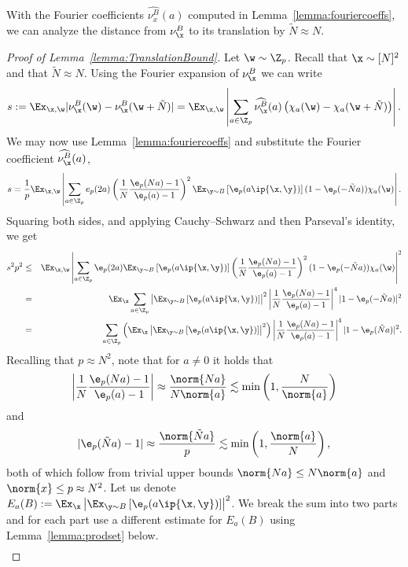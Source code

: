 With the Fourier coefficients $\widehat{\nu^B_x}(a)$ computed in Lemma~\ref{lemma:fouriercoeffs}, we can analyze the distance from $\nu^B_\x$ to its translation by $\tilde{N} \approx N$.

\begin{proof}[Proof of Lemma~\ref{lemma:TranslationBound}]
Let $\w \sim \Z_p$. Recall that $\x \sim [N]^2$ and that $\tilde{N} \approx N$.
Using the Fourier expansion of $\nu_{\x}^B$ we can write
	$$ s := \Ex_{\x,\w} |\nu_{\x}^B(\w) -\nu_{\x}^B(\w+\tilde{N})| = \Ex_{\x,\w} \left| \sum_{a\in \Z_p} \widehat{\nu^B_\x}(a) \left(\chi_a(\w)-\chi_a(\w+\tilde{N}) \right) \right|.$$
	We may now use Lemma~\ref{lemma:fouriercoeffs} and substitute the Fourier coefficient $\widehat{\nu^B_\x}(a)$,
	$$
		s =    \frac{1}{p} \Ex_{\x,\w}  \left|\sum_{a\in \Z_p}
 e_p(2a)  \left(\frac{1}{N} \frac{\e_p(Na)-1}{\e_p(a)-1}\right)^2 \Ex_{\y \sim B}   \left[ \e_p(a\ip{\x,\y})\right] (1-\e_p(-\tilde{N}a))\chi_a(\w)  \right|.
  $$
  Squaring both sides, and applying Cauchy--Schwarz and then Parseval's identity, we get
  \begin{eqnarray*}
	  s^2p^2 &\le&    \Ex_{\x,\w}  \left|\sum_{a\in \Z_p} \e_p(2a) \Ex_{\y \sim B}   \left[ \e_p(a\ip{\x,\y})\right]\left(\frac{1}{N} \frac{\e_p(Na)-1}{\e_p(a)-1}\right)^2 (1-\e_p(-\tilde{N}a))\chi_a(\w)\right|^2 \nonumber \\
	  &=&  \Ex_\x \sum_{a\in \Z_p}  \left|\Ex_{\y \sim B}   \left[ \e_p(a\ip{\x,\y})\right]\right|^2 \left|\frac{1}{N} \frac{\e_p(Na)-1}{\e_p(a)-1}\right|^4 |1-\e_p(-\tilde{N}a)|^2 \nonumber  \\
	  &=&  \sum_{a\in \Z_p}  \left( \Ex_\x  \left|\Ex_{\y \sim B}   \left[ \e_p(a\ip{\x,\y})\right]\right|^2\right) \left|\frac{1}{N} \frac{\e_p(Na)-1}{\e_p(a)-1}\right|^4 |1-\e_p(\tilde{N}a)|^2 \label{eq:main}.
  \end{eqnarray*}
  Recalling that $p \approx N^2$, note that for $a \neq 0$ it holds that
	$$\left|\frac{1}{N} \frac{\e_p(Na)-1}{\e_p(a)-1}\right| \approx \frac{\norm{Na}}{N\norm{a}}\lesssim \min\left(1, \frac{N}{\norm{a}}\right)$$
 and
	$$ |\e_p(\tilde{N}a)-1| \approx \frac{\norm{\tilde{N}a}}{p}\lesssim \min \left(1, \frac{\norm{a}}{N}\right), $$
	both of which follow from trivial upper bounds $\norm{Na} \leq N\norm{a}$ and $\norm{x}\leq p \approx N^2$.
	 Let us denote $ E_a(B) :=   \Ex_\x  \left|\Ex_{\y \sim B}   \left[ \e_p(a\ip{\x,\y})\right]\right|^2$.
	 We break  the sum into two parts and for each part use a different estimate for $ E_a(B)$ using Lemma~\ref{lemma:prodset} below.
 \begin{eqnarray*}

\end{eqnarray*}
\end{proof}

